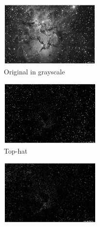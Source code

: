 \begin{figure}[!ht]
    \centering
    \begin{subfigure}{0.32\textwidth}
        \centering
        \includegraphics[width=\textwidth]{Doc/Graphics/Part1/Q12_Original_bw.png}
        \caption{Original in grayscale}
    \end{subfigure}
    \hfill
    \begin{subfigure}{0.32\textwidth}
        \centering
        \includegraphics[width=\textwidth]{Doc/Graphics/Part1/Q12_whitehat.png}
        \caption{Top-hat}
    \end{subfigure}
    \hfill
    \begin{subfigure}{0.32\textwidth}
        \centering
        \includegraphics[width=\textwidth]{Doc/Graphics/Part1/Q12_blackhat.png}

\end{subfigure}
\end{figure}
